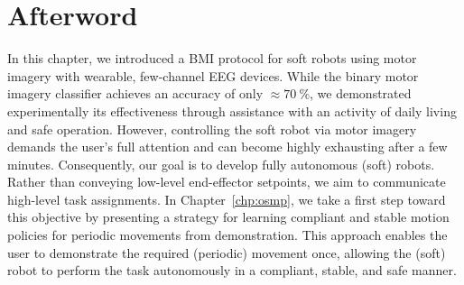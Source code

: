 \section*{Afterword}
In this chapter, we introduced a \gls{BMI} protocol for soft robots using motor imagery with wearable, few-channel \gls{EEG} devices. While the binary motor imagery classifier achieves an accuracy of only $\approx \SI{70}{\percent}$, we demonstrated experimentally its effectiveness through assistance with an activity of daily living and safe operation. However, controlling the soft robot via motor imagery demands the user’s full attention and can become highly exhausting after a few minutes. Consequently, our goal is to develop fully autonomous (soft) robots. Rather than conveying low-level end-effector setpoints, we aim to communicate high-level task assignments. In Chapter~\ref{chp:osmp}, we take a first step toward this objective by presenting a strategy for learning compliant and stable motion policies for periodic movements from demonstration. This approach enables the user to demonstrate the required (periodic) movement once, allowing the (soft) robot to perform the task autonomously in a compliant, stable, and safe manner.